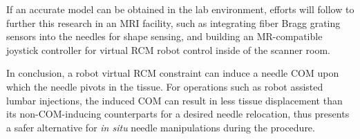 If an accurate model can be obtained in the lab environment, efforts will follow to further this research in an MRI facility, such as integrating fiber Bragg grating sensors into the needles for shape sensing, and building an MR-compatible joystick controller for virtual RCM robot control inside of the scanner room.

In conclusion, a robot virtual RCM constraint can induce a needle COM upon which the needle pivots in the tissue. For operations such as robot assisted lumbar injections, the induced COM can result in less tissue displacement than its non-COM-inducing counterparts for a desired needle relocation, thus presents a safer alternative for \textit{in situ} needle manipulations during the procedure. 


